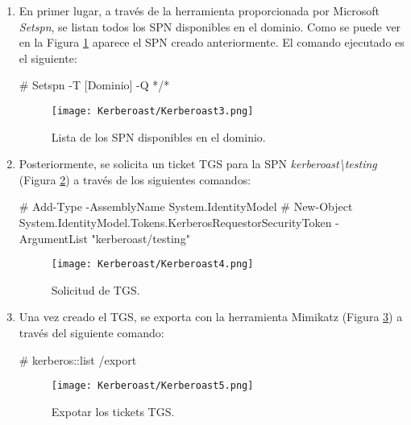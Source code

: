 \begin{enumerate}
\item En primer lugar, a través de la herramienta proporcionada por Microsoft {\it Setspn}, se listan todos los SPN disponibles en el dominio. Como se puede ver en la Figura \ref{Kerberoast3} aparece el SPN creado anteriormente. El comando ejecutado es el siguiente: 

\begin{listing}[style=consola, numbers=none]
# Setspn -T [Dominio] -Q */*
\end{listing}

\begin{figure}[H] %
\begin{center}
\texttt{[image: Kerberoast/Kerberoast3.png]}
\end{center}
\caption{Lista de los SPN disponibles en el dominio.}
\label{Kerberoast3}
\end{figure}

\item Posteriormente, se solicita un ticket TGS para la SPN {\it kerberoast\textbackslash{}testing} (Figura \ref{Kerberoast4}) a través de los siguientes comandos:

\begin{listing}[style=consola, numbers=none]
# Add-Type -AssemblyName System.IdentityModel
# New-Object System.IdentityModel.Tokens.KerberosRequestorSecurityToken -ArgumentList "kerberoast/testing"
\end{listing}

\begin{figure}[H] %
\begin{center}
\texttt{[image: Kerberoast/Kerberoast4.png]}
\end{center}
\caption{Solicitud de TGS.}
\label{Kerberoast4}
\end{figure}

\item Una vez creado el TGS, se exporta con la herramienta Mimikatz (Figura \ref{Kerberoast5}) a través del siguiente comando:
\begin{listing}[style=consola, numbers=none]
# kerberos::list /export
\end{listing}
\begin{figure}[H] %
\begin{center}
\texttt{[image: Kerberoast/Kerberoast5.png]}
\end{center}
\caption{Expotar los tickets TGS.}
\label{Kerberoast5}
\end{figure}


\end{enumerate}
